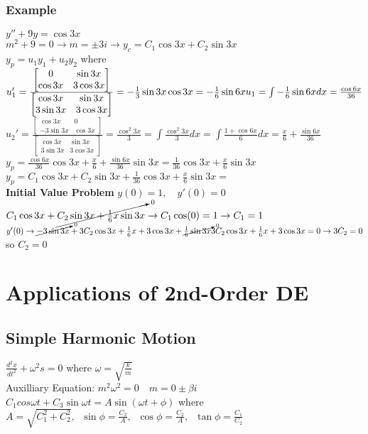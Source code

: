 \documentclass{article}
\begin{document}
\subsubsection{Example}$y''+9y=\cos 3x$
\\[0.1in]$m^2+9=0 \rightarrow m=\pm 3i \rightarrow y_c=C_1 \cos 3x + C_2 \sin 3x $
\\[0.1in]$y_p=u_1y_1+u_2y_2$ where $u_1'=\frac{\begin{bmatrix}0&\sin 3x\\\cos 3x&3\cos 3x\end{bmatrix}}{\begin{bmatrix}\cos 3x&\sin 3x\\3\sin 3x & 3\cos 3x \end{bmatrix}}= -\frac{1}{3}\sin 3x \cos 3x = -\frac{1}{6}\sin 6x\\
u_1=\int -\frac{1}{6}\sin 6x dx = \frac{\cos 6x}{36}$\\
$u_2'=\frac{\begin{bmatrix}\cos 3x & 0 \\ -3\sin 3x & \cos 3x\end{bmatrix}}{\begin{bmatrix}\cos 3x&\sin 3x\\3\sin 3x & 3\cos 3x \end{bmatrix}} = \frac{\cos^2 3x}{3}=\int \frac{\cos^2 3x}{3} dx=\int \frac{1+ \cos 6x}{6} dx = \frac{x}{6}+\frac{\sin 6x}{36}$
\\$y_p=\frac{\cos 6x }{36}\cos 3x + \frac{x}{6}+\frac{\sin 6x}{36}\sin 3x = \frac{1}{36}\cos 3x + \frac{x}{6}\sin 3x$
\\$y_p=C_1 \cos 3x + C_2 \sin 3x+\frac{1}{36}\cos 3x + \frac{x}{6}\sin 3x =$ \\
\textbf{Initial Value Problem} $y(0)=1,\quad y'(0)=0$
\\$C_1\cos 3x + \cancelto{0}{C_2 \sin 3x + \frac{1}{6}x \sin 3x} \rightarrow C_1 \cos(0)=1 \rightarrow C_1=1$
\\$y'(0) \rightarrow \cancelto{0}{-3\sin 3x} +3C_2\cos 3x+\frac{1}{6}x+3\cos 3x + \cancelto{0}{\frac{1}{6}\sin 3x}\\
3C_2\cos 3x+\frac{1}{6}x+3\cos 3x=0 \rightarrow 3C_2=0$ so $C_2=0$
\\
\pagebreak
\section{Applications of 2nd-Order DE}
\subsection{Simple Harmonic Motion}
$\frac{d^2x}{dt^2}+\omega ^2s=0$ where $\omega = \sqrt{\frac{k}{m}}$
\\Auxilliary Equation: $m^2\omega ^2=0 \quad m=0\pm\beta i$
\\$C_1cos \omega t + C_3 \sin \omega t = A\sin (\omega t + \phi)$ where $A=\sqrt{C_1^2+C_2^2},\;\; \sin\phi=\frac{C_2}{A},\;\; \cos\phi=\frac{C_2}{A},\;\;\tan\phi=\frac{C_1}{C_2}$
\end{document}
